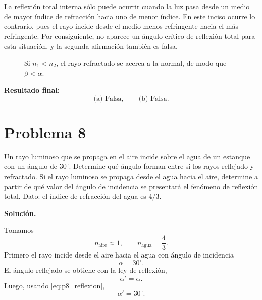 \documentclass[11pt]{article}
\newcommand{\soluciontitulo}{%
    \par\medskip
    \noindent\textbf{Soluci\'on.}\par
    \smallskip
}
\newcommand{\resultadofinal}[1]{%
    \par\medskip
    \noindent\textbf{Resultado final:} #1\par
}
\newcommand{\problematitulo}[1]{%
    \clearpage
    \section*{Problema #1}
    \setcounter{equation}{0}
    \renewcommand{\theequation}{#1.\arabic{equation}}
    \renewcommand{\theHequation}{#1.\arabic{equation}}
}
\begin{document}
La reflexi\'on total interna s\'olo puede ocurrir cuando la luz pasa desde un medio de mayor \'indice de refracci\'on hacia uno de menor \'indice. En este inciso ocurre lo contrario, pues el rayo incide desde el medio menos refringente hacia el m\'as refringente. Por consiguiente, no aparece un \'angulo cr\'itico de reflexi\'on total para esta situaci\'on, y la segunda afirmaci\'on tambi\'en es falsa.

\begin{figure}[H]
\centering
{}
\caption{Si $n_1<n_2$, el rayo refractado se acerca a la normal, de modo que $\beta<\alpha$.}
\end{figure}

\resultadofinal{%
\begin{equation*}
    \boxed{\text{(a) Falsa}},
    \qquad
    \boxed{\text{(b) Falsa}}.
\end{equation*}}

\problematitulo{8}

Un rayo luminoso que se propaga en el aire incide sobre el agua de un estanque con un \'angulo de $30^\circ$. Determine qu\'e \'angulo forman entre s\'i los rayos reflejado y refractado. Si el rayo luminoso se propaga desde el agua hacia el aire, determine a partir de qu\'e valor del \'angulo de incidencia se presentar\'a el fen\'omeno de reflexi\'on total. Dato: el \'indice de refracci\'on del agua es $4/3$.

\soluciontitulo

Tomamos
\begin{equation*}
    n_{\text{aire}}\approx1,
    \qquad
    n_{\text{agua}}=\frac{4}{3}.
\end{equation*}
Primero el rayo incide desde el aire hacia el agua con \'angulo de incidencia
\begin{equation*}
    \alpha=30^\circ.
\end{equation*}
El \'angulo reflejado se obtiene con la ley de reflexi\'on,
\begin{equation}
    \alpha'=\alpha.
    \label{eq:p8_reflexion}
\end{equation}
Luego, usando \eqref{eq:p8_reflexion},
\begin{equation*}
    \alpha'=30^\circ.
\end{equation*}
\end{document}
